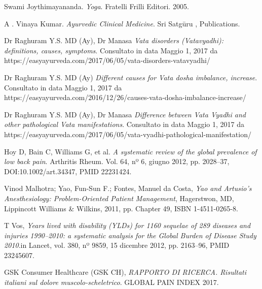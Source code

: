 \begin{thebibliography}{3}
 Swami Joythimayananda. \textit{Yoga}. Fratelli Frilli Editori. 2005. 



 A . Vinaya Kumar. \textit{Ayurvedic Clinical Medicine}. Sri Satg\={u}ru
, Publications.

 Dr Raghuram Y.S. MD (Ay), Dr Manasa \textit{Vata disorders (Vatavyadhi): definitions, causes, symptoms}. Consultato in data Maggio 1, 2017 da https://easyayurveda.com/2017/06/05/vata-disorders-vatavyadhi/

 Dr Raghuram Y.S. MD (Ay) \textit{Different causes for Vata dosha imbalance, increase}. Consultato in data Maggio 1, 2017 da https://easyayurveda.com/2016/12/26/causes-vata-dosha-imbalance-increase/

 Dr Raghuram Y.S. MD (Ay), Dr Manasa \textit{Difference between Vata Vyadhi and other pathological Vata manifestations}. Consultato in data Maggio 1, 2017 da https://easyayurveda.com/2017/06/05/vata-vyadhi-pathological-manifestation/



 Hoy D, Bain C, Williams G, et al. \textit{A systematic review of the global prevalence of low back pain}. Arthritis Rheum. Vol. 64, nº 6, giugno 2012, pp. 2028–37, DOI:10.1002/art.34347, PMID 22231424.

 Vinod Malhotra; Yao, Fun-Sun F.; Fontes, Manuel da Costa, \textit{Yao and Artusio's Anesthesiology: Problem-Oriented Patient Management}, Hagerstwon, MD, Lippincott Williams \& Wilkins, 2011, pp. Chapter 49, ISBN 1-4511-0265-8.

 T Vos, \textit{Years lived with disability (YLDs) for 1160 sequelae of 289 diseases and injuries 1990–2010: a systematic analysis for the Global Burden of Disease Study 2010}.in Lancet, vol. 380, nº 9859, 15 dicembre 2012, pp. 2163–96, PMID 23245607.

 GSK Consumer Healthcare (GSK CH), \textit{RAPPORTO DI RICERCA. Risultati italiani sul dolore muscolo-scheletrico}. GLOBAL PAIN INDEX 2017. 



\end{thebibliography}
